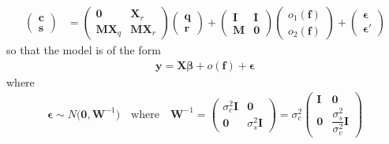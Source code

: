 \documentclass[a4paper,english]{article}
\begin{document}
\begin{align*}
 \begin{pmatrix} \bm{c} \\ \bm{s} \end{pmatrix} 
   &= \begin{pmatrix} \bm{0} & \bm{X}_r \\ \bm{MX}_q & \bm{MX}_r \end{pmatrix}
      \begin{pmatrix} \bm{q} \\ \bm{r} \end{pmatrix} + 
      \begin{pmatrix} \bm{I} & \bm{I} \\ \bm{M} & \bm{0} \end{pmatrix}
      \begin{pmatrix} o_1(\bm{f}) \\ o_2(\bm{f}) \end{pmatrix} +
      \begin{pmatrix} \bm{\epsilon} \\ \bm{\epsilon}' \end{pmatrix}
\end{align*}
so that the model is of the form
\begin{align*}
 \bm{y} = \bm{X}\bm{\beta} + o(\bm{f}) + \bm{\epsilon}
\end{align*}
where
\begin{align*}
 \bm{\epsilon} \sim N \Bigg( \bm{0}, \bm{W}^{-1} \Bigg) 
   \quad \text{where} \quad 
     \bm{W}^{-1} = \begin{pmatrix} \sigma_c^2\bm{I} & \bm{0} \\
                              \bm{0}  & \sigma_s^2\bm{I} \end{pmatrix}
                 = \sigma_c^2 \begin{pmatrix} \bm{I} & \bm{0} \\
                              \bm{0}  & \dfrac{\sigma_s^2}{\sigma_c^2}\bm{I} \end{pmatrix}
\end{align*}
\end{document}
